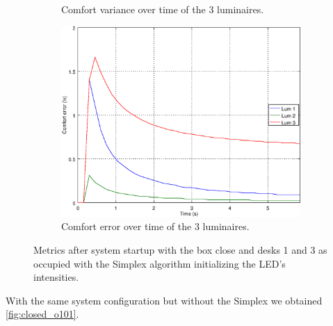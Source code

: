 \begin{figure}[ht]
\begin{subfigure}[t]{0.32\textwidth}
    \caption{Comfort variance over time of the 3 luminaires.}
    \label{fig:f_}
    \end{subfigure}
    \begin{subfigure}[t]{0.32\textwidth}
    \centering
    \includegraphics[width=.95\textwidth]{img/n_}
    \caption{Comfort error over time of the 3 luminaires.}
    \label{fig:n_}
    \end{subfigure}
    \caption{Metrics after system startup with the box close and desks 1 and 3 as occupied with the Simplex algorithm initializing the LED's intensities.}
    \label{fig:res_simplex}
\end{figure}

With the same system configuration but without the Simplex we obtained \ref{fig:closed_o101}.

